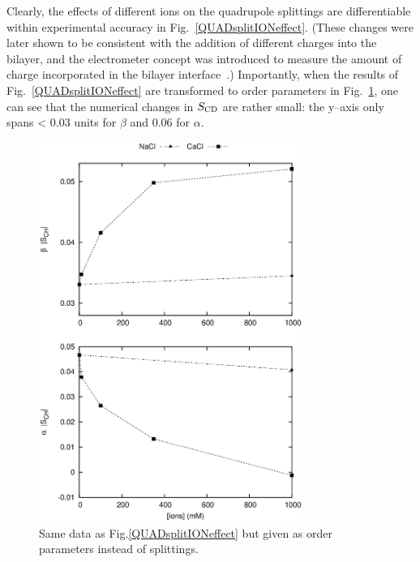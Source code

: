 \documentclass[aps,prl,superscriptaddress,twocolumn]{revtex4}
\begin{document}
Clearly, the effects of different ions on the quadrupole splittings are differentiable within experimental accuracy in Fig.~\ref{QUADsplitIONeffect}. 
(These changes were later shown to be consistent with the addition of different charges into the bilayer, and the electrometer 
concept was introduced to measure the amount of charge incorporated in the bilayer interface~\cite{scherer89}.) Importantly, 
when the results of Fig.~\ref{QUADsplitIONeffect} are transformed to order parameters in Fig.~\ref{opIONeffect}, 
one can see that the numerical changes in $S_{{\rm CD}}$ are rather small: the y--axis only spans < 0.03 units for $\beta$ and 0.06 for $\alpha$.
\begin{figure}[]
  \includegraphics[width=8.6cm]{../Fig/OrderParameterIONSexp.eps}
\newline
  \caption{\label{opIONeffect}
    Same data as Fig.\ref{QUADsplitIONeffect} but given as order parameters instead of splittings.
  } 
\end{figure}
\end{document}
